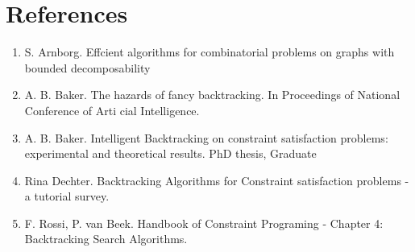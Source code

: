 \documentclass{article}
\begin{document}
\section{References}
\begin{enumerate}
  \item S. Arnborg. Effcient algorithms for combinatorial problems on
  graphs with bounded decomposability
  \item A. B. Baker. The hazards of fancy backtracking. In Proceedings of
  National Conference of Arti cial Intelligence.
  \item A. B. Baker. Intelligent Backtracking on constraint satisfaction problems: experimental and theoretical results. PhD thesis, Graduate
  \item Rina Dechter. Backtracking Algorithms for Constraint satisfaction problems - a tutorial survey.
  \item F. Rossi, P. van Beek. Handbook of Constraint Programing - Chapter 4: Backtracking Search Algorithms.
\end{enumerate}
\end{document}
